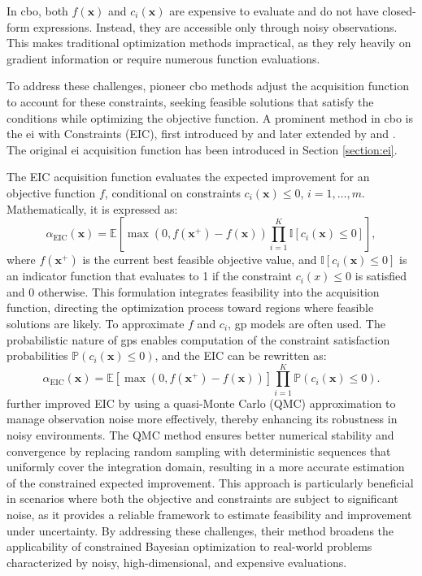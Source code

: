 In \ac{cbo}, both $f(\mathbf{x})$ and $c_i(\mathbf{x})$ are expensive to evaluate and do not have closed-form expressions. Instead, they are accessible only through noisy observations. This makes traditional optimization methods impractical, as they rely heavily on gradient information or require numerous function evaluations.

To address these challenges, pioneer \ac{cbo} methods adjust the acquisition function to account for these constraints, seeking feasible solutions that satisfy the conditions while optimizing the objective function. A prominent method in \ac{cbo} is the \acl{ei} with Constraints (EIC), first introduced by \citet{schonlau1998global} and later extended by \citet{gardner2014bayesian} and \citet{gelbart2014bayesian}. The original \ac{ei} acquisition function has been introduced in Section \ref{section:ei}.  

The EIC acquisition function evaluates the expected improvement for an objective function $f$, conditional on constraints $c_i(\mathbf{x}) \leq 0$, $i = 1, \dots, m$. Mathematically, it is expressed as:  
\[
\alpha_{\text{EIC}}(\mathbf{x}) = \mathbb{E}\left[ \max(0, f(\mathbf{x}^+) - f(\mathbf{x})) \prod_{i=1}^K \mathbb{I}[c_i(\mathbf{x}) \leq 0] \right],
\]  
where $f(\mathbf{x}^+)$ is the current best feasible objective value, and $\mathbb{I}[c_i(\mathbf{x}) \leq 0]$ is an indicator function that evaluates to 1 if the constraint $c_i(x) \leq 0$ is satisfied and 0 otherwise. This formulation integrates feasibility into the acquisition function, directing the optimization process toward regions where feasible solutions are likely. To approximate $f$ and $c_i$, \ac{gp} models are often used. The probabilistic nature of \acp{gp} enables computation of the constraint satisfaction probabilities $\mathbb{P}(c_i(\mathbf{x}) \leq 0)$, and the EIC can be rewritten as:  
\[
\alpha_{\text{EIC}}(\mathbf{x}) = \mathbb{E}\left[ \max(0, f(\mathbf{x}^+) - f(\mathbf{x})) \right] \prod_{i=1}^K \mathbb{P}(c_i(\mathbf{x}) \leq 0).
\]
\citet{letham2019constrained} further improved EIC by using a quasi-Monte Carlo (QMC) approximation to manage observation noise more effectively, thereby enhancing its robustness in noisy environments. The QMC method ensures better numerical stability and convergence by replacing random sampling with deterministic sequences that uniformly cover the integration domain, resulting in a more accurate estimation of the constrained expected improvement. This approach is particularly beneficial in scenarios where both the objective and constraints are subject to significant noise, as it provides a reliable framework to estimate feasibility and improvement under uncertainty. By addressing these challenges, their method broadens the applicability of constrained Bayesian optimization to real-world problems characterized by noisy, high-dimensional, and expensive evaluations.

